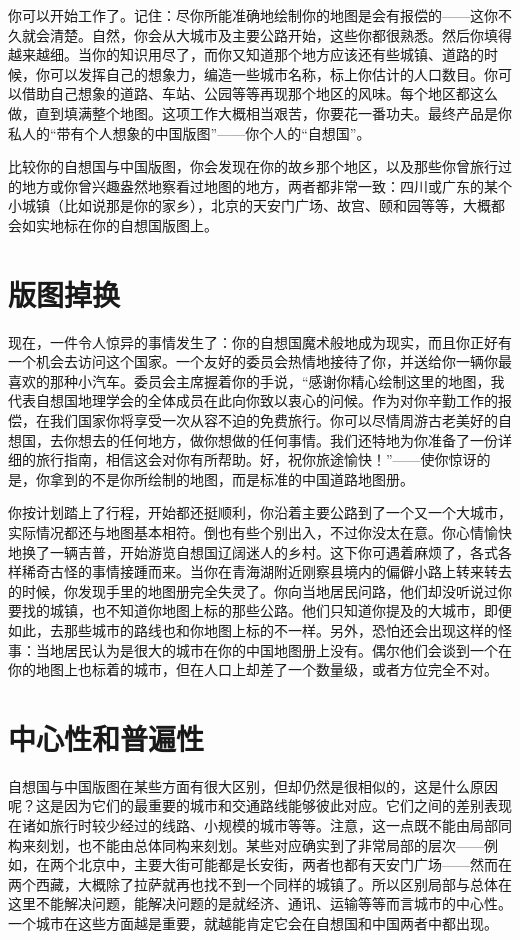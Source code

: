 你可以开始工作了。记住：尽你所能准确地绘制你的地图是会有报偿的——这你不久就会清楚。自然，你会从大城市及主要公路开始，这些你都很熟悉。然后你填得越来越细。当你的知识用尽了，而你又知道那个地方应该还有些城镇、道路的时候，你可以发挥自己的想象力，编造一些城市名称，标上你估计的人口数目。你可以借助自己想象的道路、车站、公园等等再现那个地区的风味。每个地区都这么做，直到填满整个地图。这项工作大概相当艰苦，你要花一番功夫。最终产品是你私人的“带有个人想象的中国版图”——你个人的“自想国”。

比较你的自想国与中国版图，你会发现在你的故乡那个地区，以及那些你曾旅行过的地方或你曾兴趣盎然地察看过地图的地方，两者都非常一致：四川或广东的某个小城镇（比如说那是你的家乡），北京的天安门广场、故宫、颐和园等等，大概都会如实地标在你的自想国版图上。

\section{版图掉换}

现在，一件令人惊异的事情发生了：你的自想国魔术般地成为现实，而且你正好有一个机会去访问这个国家。一个友好的委员会热情地接待了你，并送给你一辆你最喜欢的那种小汽车。委员会主席握着你的手说，“感谢你精心绘制这里的地图，我代表自想国地理学会的全体成员在此向你致以衷心的问候。作为对你辛勤工作的报偿，在我们国家你将享受一次从容不迫的免费旅行。你可以尽情周游古老美好的自想国，去你想去的任何地方，做你想做的任何事情。我们还特地为你准备了一份详细的旅行指南，相信这会对你有所帮助。好，祝你旅途愉快！”——使你惊讶的是，你拿到的不是你所绘制的地图，而是标准的中国道路地图册。

你按计划踏上了行程，开始都还挺顺利，你沿着主要公路到了一个又一个大城市，实际情况都还与地图基本相符。倒也有些个别出入，不过你没太在意。你心情愉快地换了一辆吉普，开始游览自想国辽阔迷人的乡村。这下你可遇着麻烦了，各式各样稀奇古怪的事情接踵而来。当你在青海湖附近刚察县境内的偏僻小路上转来转去的时候，你发现手里的地图册完全失灵了。你向当地居民问路，他们却没听说过你要找的城镇，也不知道你地图上标的那些公路。他们只知道你提及的大城市，即便如此，去那些城市的路线也和你地图上标的不一样。另外，恐怕还会出现这样的怪事：当地居民认为是很大的城市在你的中国地图册上没有。偶尔他们会谈到一个在你的地图上也标着的城市，但在人口上却差了一个数量级，或者方位完全不对。

\section{中心性和普遍性}

自想国与中国版图在某些方面有很大区别，但却仍然是很相似的，这是什么原因呢？这是因为它们的最重要的城市和交通路线能够彼此对应。它们之间的差别表现在诸如旅行时较少经过的线路、小规模的城市等等。注意，这一点既不能由局部同构来刻划，也不能由总体同构来刻划。某些对应确实到了非常局部的层次——例如，在两个北京中，主要大街可能都是长安街，两者也都有天安门广场——然而在两个西藏，大概除了拉萨就再也找不到一个同样的城镇了。所以区别局部与总体在这里不能解决问题，能解决问题的是就经济、通讯、运输等等而言城市的中心性。一个城市在这些方面越是重要，就越能肯定它会在自想国和中国两者中都出现。


